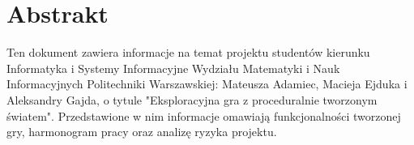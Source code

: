 \chapter{Abstrakt}

Ten dokument zawiera informacje na temat projektu studentów kierunku Informatyka i Systemy Informacyjne Wydziału Matematyki i Nauk Informacyjnych Politechniki Warszawskiej: Mateusza Adamiec, Macieja Ejduka i Aleksandry Gajda, o tytule "Eksploracyjna gra z proceduralnie tworzonym światem". Przedstawione w nim informacje omawiają funkcjonalności tworzonej gry, harmonogram pracy oraz analizę ryzyka projektu.